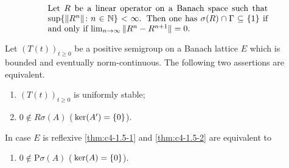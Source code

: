 \begin{equation}\label{eq:c4-1.4}
\begin{minipage}{.75\linewidth}
Let $R$ be a linear operator on a Banach space
such that $\sup\{ \|R^{n}\| \colon n \in \N \} < \infty$. Then one has
$\sigma(R) \cap \Gamma \subseteq \{1\}$ if and only if $ \lim_{n \to \infty} \|R^{n} - R^{n+1}\| = 0$.
\end{minipage}
\end{equation}
\begin{theorem}\label{thm:c4-1.5}
%
%
%
Let $(T(t))_{t\geq 0}$ be a positive semigroup on a Banach lattice $E$ which is bounded and eventually norm-continuous.
The following two assertions are equivalent.
\begin{enumerate}[\upshape (a)]
    \item \label{thm:c4-1.5-1}
    $(T(t))_{t\geq 0}$ is uniformly stable;
    
    \item \label{thm:c4-1.5-2}
    $0 \notin R\sigma(A)$ (\ie  $\mathop{}\mathrm{ker}(A') 
    = \{0\}$).
\end{enumerate}
In case $E$ is reflexive \ref{thm:c4-1.5-1} and \ref{thm:c4-1.5-2} are equivalent to
\begin{enumerate}

\item  \label{thm:c4-1.5-3}
$0 \notin \text{P}\sigma(A)$ (\ie  $\mathop{}\mathrm{ker}(A) = \{0\}$).
\end{enumerate}
\end{theorem}
